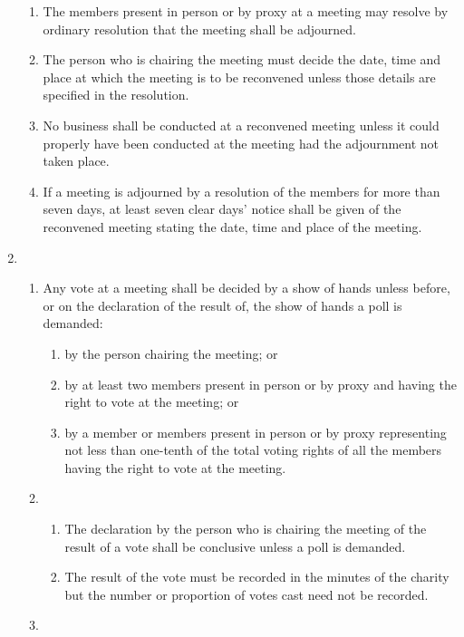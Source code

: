 \begin{enumerate}
  \begin{enumerate}
  \item
    The members present in person or by proxy at a meeting may resolve
    by ordinary resolution that the meeting shall be adjourned.
  \item
    The person who is chairing the meeting must decide the date, time
    and place at which the meeting is to be reconvened unless those
    details are specified in the resolution.
  \item
    No business shall be conducted at a reconvened meeting unless it
    could properly have been conducted at the meeting had the
    adjournment not taken place.
  \item
    If a meeting is adjourned by a resolution of the members for more
    than seven days, at least seven clear days' notice shall be given
    of the reconvened meeting stating the date, time and place of the
    meeting.
  \end{enumerate}
\item
  

  \begin{enumerate}
  \item
    Any vote at a meeting shall be decided by a show of hands unless
    before, or on the declaration of the result of, the show of hands a
    poll is demanded:
    \begin{enumerate}
    \item
      by the person chairing the meeting; or
    \item
      by at least two members present in person or by proxy and having
      the right to vote at the meeting; or
    \item
      by a member or members present in person or by proxy representing
      not less than one-tenth of the total voting rights of all the
      members having the right to vote at the meeting.
    \end{enumerate}
  \item
    

    \begin{enumerate}
    \item
      The declaration by the person who is chairing the meeting of the
      result of a vote shall be conclusive unless a poll is demanded.
    \item
      The result of the vote must be recorded in the minutes of the
      charity but the number or proportion of votes cast need not be
      recorded.
    \end{enumerate}
  \item
    


\end{enumerate}
\end{enumerate}
